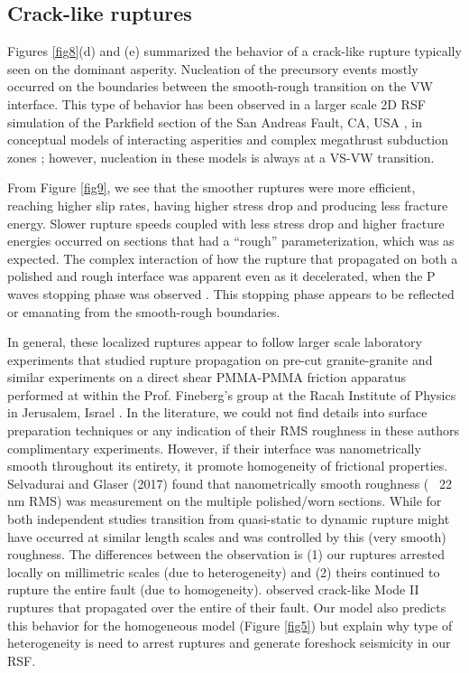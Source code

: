 \documentclass[preprint,1p, 10pt,authoryear]{elsarticle}
\begin{document}
\subsection{Crack-like ruptures}
Figures \ref{fig8}(d) and  (e) summarized the behavior of a crack-like rupture typically seen on the dominant asperity. Nucleation of the precursory events mostly occurred on the boundaries between the smooth-rough transition on the VW interface. This type of behavior has been observed in a larger scale 2D RSF simulation of the Parkfield section of the San Andreas Fault, CA, USA \citep{Barbot2012}, in conceptual models of interacting asperities \citep{Kato2003} and complex megathrust subduction zones \citep{Kaneko2010}; however, nucleation in these models is always at a VS-VW transition. 

From Figure \ref{fig9}, we see that the smoother ruptures were more efficient, reaching higher slip rates, having higher stress drop and producing less fracture energy. Slower rupture speeds coupled with less stress drop and higher fracture energies occurred on sections that had a ``rough'' parameterization, which was as expected.  The complex interaction of how the rupture that propagated on both a polished and rough interface was apparent even as it decelerated, when the P waves stopping phase was observed \citep{Madariaga1976}. This stopping phase appears to be reflected or emanating from the smooth-rough boundaries. 

In general, these localized ruptures appear to follow larger scale laboratory experiments that studied rupture propagation on pre-cut granite-granite \citep{Passelegue2013} and similar experiments on a direct shear PMMA-PMMA friction apparatus performed at within the Prof. Fineberg's group at the Racah Institute of Physics in Jerusalem, Israel \citep{Rubinstein2004,Rubinstein2006,Ben-David2010, Fineberg2015,Svetlizky2014}. In the literature, we could not find details into surface preparation techniques or any indication of their RMS roughness in these authors complimentary experiments. However, if their interface was nanometrically smooth throughout its entirety, it promote homogeneity of frictional properties. Selvadurai and Glaser (2017) found that nanometrically smooth roughness (~ 22 nm RMS) was measurement on the multiple polished/worn sections. While for both independent studies transition from quasi-static to dynamic rupture might have occurred at similar length scales and was controlled by this (very smooth) roughness. The differences between the observation is (1) our ruptures arrested locally on millimetric scales (due to heterogeneity) and (2) theirs continued to rupture the entire fault (due to homogeneity). \citet{Svetlizky2014} observed crack-like Mode II ruptures that propagated over the entire of their fault. Our model also predicts this behavior for the homogeneous model (Figure \ref{fig5}) but explain why type of heterogeneity is need to arrest ruptures and generate foreshock seismicity in our RSF.
\end{document}
